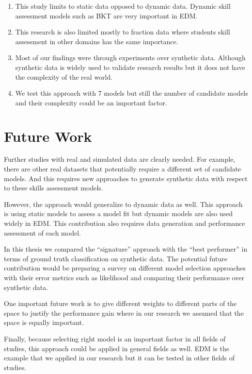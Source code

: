   \begin{enumerate}
  \item This study limits to static data opposed to dynamic data. Dynamic skill assessment models such as BKT are very important in EDM.  
  \item This research is also limited mostly to fraction data where students skill assessment in other domains has the same importance.%
  \item Most of our findings were through experiments over synthetic data. Although synthetic data is widely used to validate research results but it does not have the complexity of the real world.%
  \item We test this approach with 7 models but still the number of candidate models and their complexity could be an important factor. %
  \end{enumerate}

\section{Future Work}

Further studies with real and simulated data are clearly needed.  For example, there are other real datasets that potentially require a different set of candidate models. And this requires new approaches to generate synthetic data with respect to these skills assessment models.

However, the approach would generalize to dynamic data as well. This approach is using static models to assess a model fit but dynamic models are also used widely in EDM. This contribution also requires data generation and performance assessment of each model.

In this thesis we compared the ``signature'' approach with the ``best performer'' in terms of ground truth classification on synthetic data. The potential future contribution would be preparing a survey on different model selection approaches with their error metrics such as likelihood and comparing their performance over synthetic data.

One important future work is to give different weights to different parts of the space to justify the performance gain where in our research we assumed that the space is equally important.

Finally, because selecting right model is an important factor in all fields of studies, this approach could be applied in general fields as well. EDM is the example that we applied in our research but it can be tested in other fields of studies.
